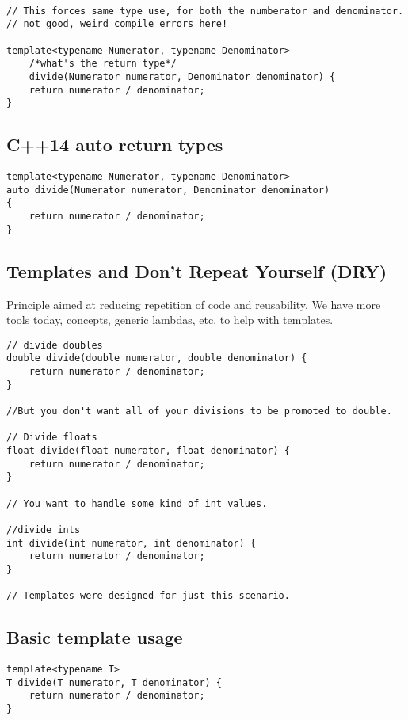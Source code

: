 \begin{verbatim}

// This forces same type use, for both the numberator and denominator. 
// not good, weird compile errors here!

template<typename Numerator, typename Denominator>
    /*what's the return type*/
    divide(Numerator numerator, Denominator denominator) {
    return numerator / denominator;
}
\end{verbatim}

\subsection{C++14 auto return types}

\begin{verbatim}
template<typename Numerator, typename Denominator>
auto divide(Numerator numerator, Denominator denominator)
{
    return numerator / denominator;
}
\end{verbatim}

\subsection{Templates and Don't Repeat Yourself (DRY)}

Principle aimed at reducing repetition of code and reusability. 
We have more tools today, concepts, generic lambdas, etc. to help with templates.

\begin{verbatim}
// divide doubles
double divide(double numerator, double denominator) {
    return numerator / denominator;
}

//But you don't want all of your divisions to be promoted to double. 

// Divide floats
float divide(float numerator, float denominator) {
    return numerator / denominator;
}

// You want to handle some kind of int values. 

//divide ints
int divide(int numerator, int denominator) {
    return numerator / denominator;
}

// Templates were designed for just this scenario. 
\end{verbatim}

\subsection{Basic template usage}

\begin{verbatim}
template<typename T>
T divide(T numerator, T denominator) {
    return numerator / denominator;
}
\end{verbatim}

